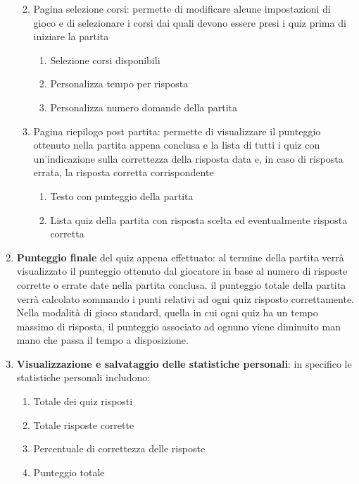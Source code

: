 \begin{enumerate}
\begin{enumerate}
\begin{enumerate}
                        \end{enumerate}
                    \item Pagina selezione corsi: permette di modificare alcune impostazioni di gioco e di selezionare i corsi dai quali devono essere presi i quiz prima di iniziare la partita
                        \begin{enumerate}
                            \item Selezione corsi disponibili
                            \item Personalizza tempo per risposta
                            \item Personalizza numero domande della partita
                        \end{enumerate}
                    \item Pagina riepilogo post partita: permette di visualizzare il punteggio ottenuto nella partita appena conclusa e la lista di tutti i quiz con un'indicazione sulla correttezza della risposta data e, in caso di risposta errata, la risposta corretta corrispondente
                    \begin{enumerate}
                        \item Testo con punteggio della partita
                        \item Lista quiz della partita con risposta scelta ed eventualmente risposta corretta
                    \end{enumerate}
                \end{enumerate}
            
            \item \textbf{Punteggio finale} del quiz appena effettuato: al termine della partita verrà visualizzato il punteggio ottenuto dal giocatore in base al numero di risposte corrette o errate date nella partita conclusa. il punteggio totale della partita verrà calcolato sommando i punti relativi ad ogni quiz risposto correttamente. Nella modalità di gioco standard, quella in cui ogni quiz ha un tempo massimo di risposta, il punteggio associato ad ognuno viene diminuito man mano che passa il tempo a disposizione.
            
            \item \textbf{Visualizzazione e salvataggio delle statistiche personali}: in specifico le statistiche personali includono:
                \begin{enumerate}
                    \item Totale dei quiz risposti
                    \item Totale risposte corrette
                    \item Percentuale di correttezza delle risposte
                    \item Punteggio totale
                \end{enumerate}
            

\end{enumerate}
